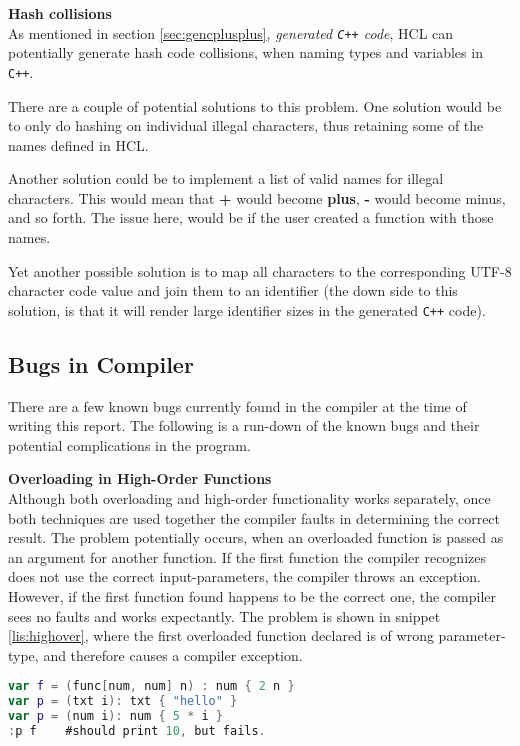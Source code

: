 \textbf{Hash collisions}\\
As mentioned in section \ref{sec:gencplusplus}, \textit{generated \texttt{C++} code}, HCL can potentially generate hash code collisions, when naming types and variables in \texttt{C++}.

There are a couple of potential solutions to this problem.
One solution would be to only do hashing on individual illegal characters, thus retaining some of the names defined in HCL.

Another solution could be to implement a list of valid names for illegal characters.
This would mean that \textbf{+} would become \textbf{plus}, \textbf{-} would become minus, and so forth.
The issue here, would be if the user created a function with those names.

Yet another possible solution is to map all characters to the corresponding UTF-8 character code value and join them to an identifier (the down side to this solution, is that it will render large identifier sizes in the generated \texttt{C++} code).

\subsection{Bugs in Compiler}
There are a few known bugs currently found in the compiler at the time of writing this report. 
The following is a run-down of the known bugs and their potential complications in the program. 

\textbf{Overloading in High-Order Functions}\\
Although both overloading and high-order functionality works separately, once both techniques are used together the compiler faults in determining the correct result.
The problem potentially occurs, when an overloaded function is passed as an argument for another function. 
If the first function the compiler recognizes does not use the correct input-parameters, the compiler throws an exception.
However, if the first function found happens to be the correct one, the compiler sees no faults and works expectantly.
The problem is shown in snippet \ref{lis:highover}, where the first overloaded function declared is of wrong parameter-type, and therefore causes a compiler exception. 
\begin{lstlisting}[language=Kotlin,label=lis:highover,caption=Overloading in high-order functions problem.]
var f = (func[num, num] n) : num { 2 n }
var p = (txt i): txt { "hello" }
var p = (num i): num { 5 * i }
:p f 	#should print 10, but fails. 
\end{lstlisting}

